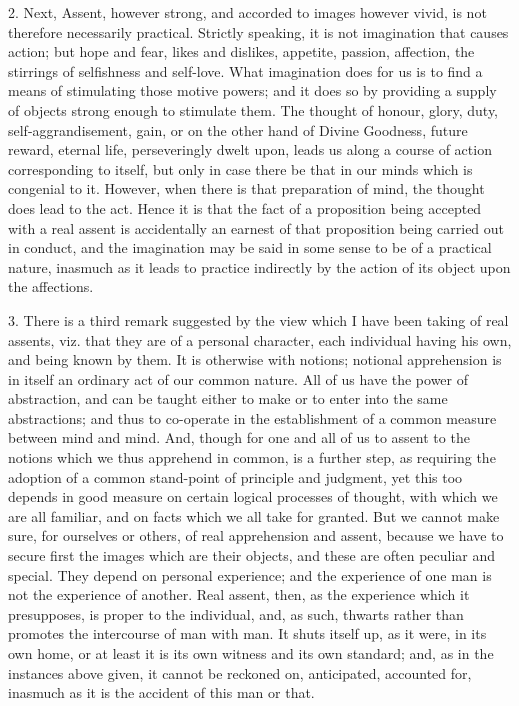 2. Next, Assent, however strong, and accorded to images however
vivid, is not therefore necessarily practical. Strictly speaking, it
is not imagination that causes action; but hope and fear, likes and
dislikes, appetite, passion, affection, the stirrings of selfishness
and self-love. What imagination does for us is to find a means of
stimulating those motive powers; and it does so by providing a supply
of objects strong enough to stimulate them. The thought of honour,
glory, duty, self-aggrandisement, gain, or on the other hand of Divine
Goodness, future reward, eternal life, perseveringly dwelt upon, leads
us along a course of action corresponding to itself, but only in case
there be that in our minds which is congenial to it. However, when
there is that preparation of mind, the thought does lead to the
act. Hence it is that the fact of a proposition being accepted with a
real assent is accidentally an earnest of that proposition being
carried out in conduct, and the imagination may be said in some sense
to be of a practical nature, inasmuch as it leads to practice
indirectly by the action of its object upon the affections.

3. There is a third remark suggested by the view which I have been
taking of real assents, viz. that they are of a personal character,
each individual having his own, and being known by them. It is
otherwise with notions; notional apprehension is in itself an ordinary
act of our common nature. All of us have the power of abstraction, and
can be taught either to make or to enter into the same abstractions;
and thus to co-operate in the establishment of a common measure between
mind and mind. And, though for one and all of us to assent to the
notions which we thus apprehend in common, is a further step, as
requiring the adoption of a common stand-point of principle and
judgment, yet this too depends in good measure on certain logical
processes of thought, with which we are all familiar, and on facts
which we all take for granted. But we cannot make sure, for ourselves
or others, of real apprehension and assent, because we have to secure
first the images which are their objects, and these are often peculiar
and special. They depend on personal experience; and the experience of
one man is not the experience of another. Real assent, then, as the
experience which it presupposes, is proper to the individual, and, as
such, thwarts rather than promotes the intercourse of man with man. It
shuts itself up, as it were, in its own home, or at least it is
its own witness and its own standard; and, as in the instances above
given, it cannot be reckoned on, anticipated, accounted for, inasmuch
as it is the accident of this man or that.

